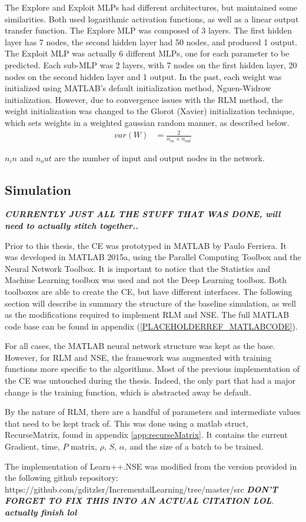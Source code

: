 \par The Explore and Exploit MLPs had different architectures, but maintained some similarities. Both used logarithmic activation functions, as well as a linear output transfer function. The Explore MLP was composed of 3 layers. The first hidden layer has 7 nodes, the second hidden layer had 50 nodes, and produced 1 output. The Exploit MLP was actually 6 different MLPs, one for each parameter to be predicted. Each sub-MLP was 2 layers, with 7 nodes on the first hidden layer, 20 nodes on the second hidden layer and 1 output. In the past, each weight was initialized using MATLAB's default initialization method, Nguen-Widrow initialization. However, due to convergence issues with the RLM method, the weight initialization was changed to the Glorot (Xavier) initialization technique, which sets weights in a weighted gaussian random manner, as described below.
\begin{align*}
	var(W) &= \frac{2}{n_{in}+n_{out}}
\end{align*} 
\par $n_in$ and $n_out$ are the number of input and output nodes in the network.
\subsection{Simulation}
\textbf{\textit{CURRENTLY JUST ALL THE STUFF THAT WAS DONE, will need to actually stitch together..}} \\
\par Prior to this thesis, the CE was prototyped in MATLAB by Paulo Ferriera. It was developed in MATLAB 2015a, using the Parallel Computing Toolbox and the Neural Network Toolbox. It is important to notice that the Statistics and Machine Learning toolbox was used and not the Deep Learning toolbox. Both toolboxes are able to create the CE, but have different interfaces. The following section will describe in summary the structure of the baseline simulation, as well as the modifications required to implement RLM and NSE. The full MATLAB code base can be found in appendix (\ref{PLACEHOLDERREF_MATLABCODE}).
\par For all cases, the MATLAB neural network structure was kept as the base. However, for RLM and NSE, the framework was augmented with training functions more specific to the algorithms. Most of the previous implementation of the CE was untouched during the thesis. Indeed, the only part that had a major change is the training function, which is abstracted away be default. 
\par By the nature of RLM, there are a handful of parameters and intermediate values that need to be kept track of. This was done using a matlab struct, RecurseMatrix, found in appendix \ref{app:recurseMatrix}. It contains the current Gradient, time, $P$ matrix, $\rho$, $S$, $\alpha$, and the size of a batch to be trained.  
\par  The implementation of Learn++.NSE was modified from the version provided in the following github repository: https://github.com/gditzler/IncrementalLearning/tree/master/src \textbf{\textit{DON'T FORGET TO FIX THIS INTO AN ACTUAL CITATION LOL}}. \textbf{\textit{actually finish lol}}

